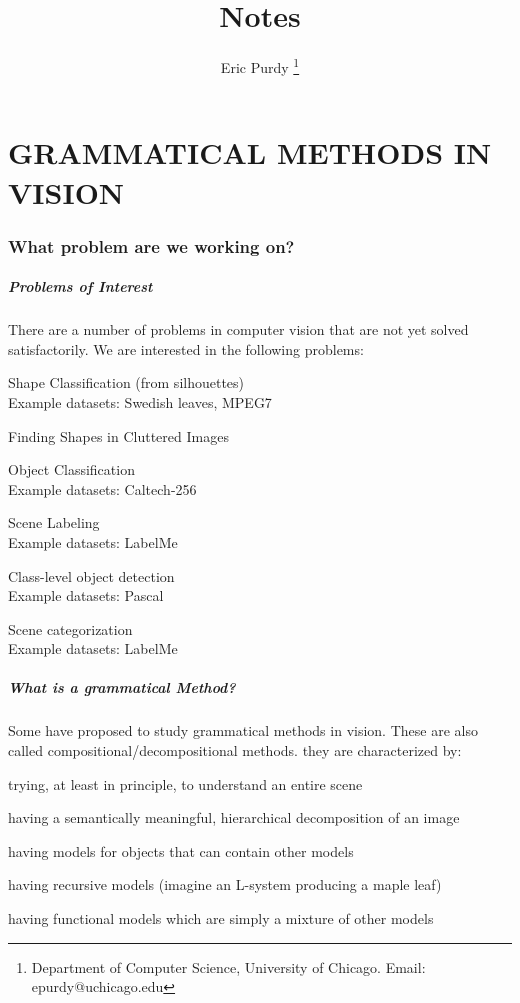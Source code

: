 \documentclass{article}
\title{Notes}
\author{Eric Purdy \footnote{Department of Computer Science,
    University of Chicago. Email: epurdy@uchicago.edu}}
\begin{document}
\maketitle

\tableofcontents


\part{GRAMMATICAL METHODS IN VISION}


\section{What problem are we working on?}

\subsubsection{Problems of Interest}
There are a number of problems in computer vision that are not yet
solved satisfactorily.  We are interested in the following problems:

\bitem
\item Shape Classification (from silhouettes) \\
  Example datasets: Swedish leaves, MPEG7
\item Finding Shapes in Cluttered Images
\item Object Classification\\
  Example datasets: Caltech-256
\item Scene Labeling \\
  Example datasets: LabelMe
\item Class-level object detection \\
  Example datasets: Pascal
\item Scene categorization \\
  Example datasets: LabelMe
\eitem


\subsubsection{What is a grammatical Method?}
Some have proposed to study grammatical methods in vision.
These are also called compositional/decompositional methods.
they are characterized by:

\bitem
\item trying, at least in principle, to understand an entire scene
\item having a semantically meaningful, hierarchical decomposition of an image
\item having models for objects that can contain other models
\item having recursive models (imagine an L-system producing a maple leaf)
\item having functional models which are simply a mixture of other models
\eitem
\end{document}
